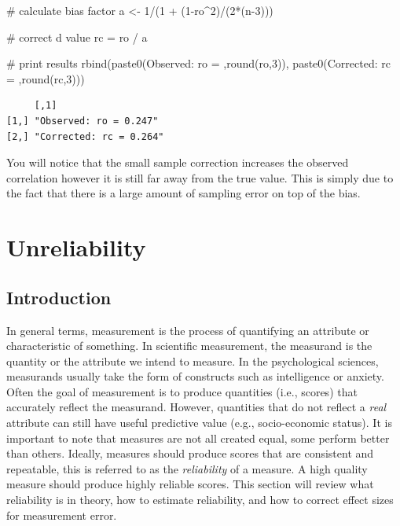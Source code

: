 \documentclass[
  letterpaper,
  DIV=11,
  numbers=noendperiod]{scrreprt}
\newenvironment{Shaded}{\begin{snugshade}}{\end{snugshade}}
\newcommand{\CommentTok}[1]{\textcolor[rgb]{0.37,0.37,0.37}{#1}}
\newcommand{\DecValTok}[1]{\textcolor[rgb]{0.68,0.00,0.00}{#1}}
\newcommand{\FunctionTok}[1]{\textcolor[rgb]{0.28,0.35,0.67}{#1}}
\newcommand{\NormalTok}[1]{\textcolor[rgb]{0.00,0.23,0.31}{#1}}
\newcommand{\OtherTok}[1]{\textcolor[rgb]{0.00,0.23,0.31}{#1}}
\newcommand{\SpecialCharTok}[1]{\textcolor[rgb]{0.37,0.37,0.37}{#1}}
\newcommand{\StringTok}[1]{\textcolor[rgb]{0.13,0.47,0.30}{#1}}
\begin{document}
\begin{Shaded}
\begin{Highlighting}[]
\CommentTok{\# calculate bias factor}
\NormalTok{a }\OtherTok{\textless{}{-}} \DecValTok{1}\SpecialCharTok{/}\NormalTok{(}\DecValTok{1} \SpecialCharTok{+}\NormalTok{ (}\DecValTok{1}\SpecialCharTok{{-}}\NormalTok{ro}\SpecialCharTok{\^{}}\DecValTok{2}\NormalTok{)}\SpecialCharTok{/}\NormalTok{(}\DecValTok{2}\SpecialCharTok{*}\NormalTok{(n}\DecValTok{{-}3}\NormalTok{)))}

\CommentTok{\# correct d value}
\NormalTok{rc }\OtherTok{=}\NormalTok{ ro }\SpecialCharTok{/}\NormalTok{ a}

\CommentTok{\# print results}
\FunctionTok{rbind}\NormalTok{(}\FunctionTok{paste0}\NormalTok{(}\StringTok{\textquotesingle{}Observed: ro = \textquotesingle{}}\NormalTok{,}\FunctionTok{round}\NormalTok{(ro,}\DecValTok{3}\NormalTok{)),}
      \FunctionTok{paste0}\NormalTok{(}\StringTok{\textquotesingle{}Corrected: rc = \textquotesingle{}}\NormalTok{,}\FunctionTok{round}\NormalTok{(rc,}\DecValTok{3}\NormalTok{)))}
\end{Highlighting}
\end{Shaded}

\begin{verbatim}
     [,1]                   
[1,] "Observed: ro = 0.247" 
[2,] "Corrected: rc = 0.264"
\end{verbatim}

You will notice that the small sample correction increases the observed
correlation however it is still far away from the true value. This is
simply due to the fact that there is a large amount of sampling error on
top of the bias.

\hypertarget{unreliability}{%
\chapter{Unreliability}\label{unreliability}}

\hypertarget{introduction-1}{%
\section{Introduction}\label{introduction-1}}

In general terms, measurement is the process of quantifying an attribute
or characteristic of something. In scientific measurement, the measurand
is the quantity or the attribute we intend to measure. In the
psychological sciences, measurands usually take the form of constructs
such as intelligence or anxiety. Often the goal of measurement is to
produce quantities (i.e., scores) that accurately reflect the measurand.
However, quantities that do not reflect a \emph{real} attribute can
still have useful predictive value (e.g., socio-economic status). It is
important to note that measures are not all created equal, some perform
better than others. Ideally, measures should produce scores that are
consistent and repeatable, this is referred to as the \emph{reliability}
of a measure. A high quality measure should produce highly reliable
scores. This section will review what reliability is in theory, how to
estimate reliability, and how to correct effect sizes for measurement
error.
\end{document}
